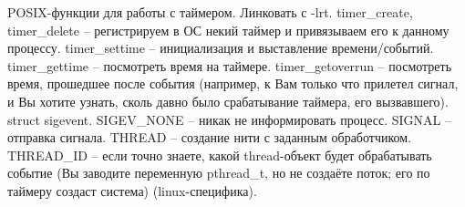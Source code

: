 \documentclass[a4paper,10pt]{article}
\begin{document}
POSIX-функции для работы с таймером.
Линковать с -lrt.
timer\_create, timer\_delete -- регистрируем в ОС некий таймер и привязываем его к данному процессу.
timer\_settime -- инициализация и выставление времени/событий.
timer\_gettime -- посмотреть время на таймере.
timer\_getoverrun -- посмотреть время, прошедшее после события (например, к Вам только что прилетел сигнал, и Вы хотите узнать, сколь давно было срабатывание таймера, его вызвавшего).
struct sigevent. SIGEV\_NONE -- никак не информировать процесс. SIGNAL -- отправка сигнала. THREAD -- создание нити с заданным обработчиком. THREAD\_ID -- если точно знаете, какой thread-объект будет обрабатывать событие (Вы заводите переменную pthread\_t, но не создаёте поток; его по таймеру создаст система) (linux-специфика).
\end{document}
